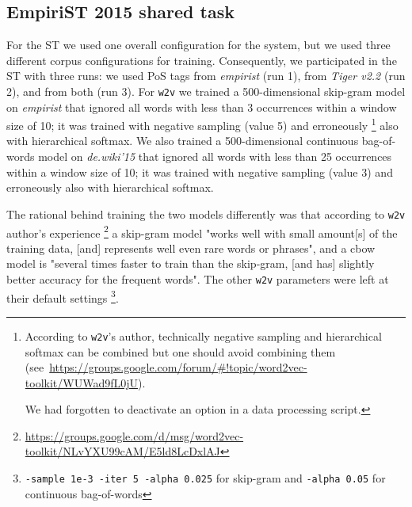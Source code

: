 \documentclass[11pt]{article}
\newcommand\wtv{\texttt{w2v}\xspace}
\begin{document}
%
%


\subsection{EmpiriST 2015 shared task} %
\label{ssec:case_empirist}

For the ST we used one overall configuration for the system, but we used three
different corpus configurations for training.
Consequently, we participated in the ST with three runs:
we used PoS tags from \emph{empirist} (run 1), from \emph{Tiger v2.2} (run 2),
and from both (run 3).  
For \wtv we trained a 500-dimensional skip-gram model on \emph{empirist} that
ignored all words with less than 3 occurrences within a window size of 10;
it was trained with negative sampling (value 5) and erroneously%
\footnote{%
    According to \wtv's author, technically negative sampling and
    hierarchical softmax can be combined but one should avoid combining them~%
    (see~\url{https://groups.google.com/forum/#!topic/word2vec-toolkit/WUWad9fL0jU}).
    
    We had forgotten to deactivate an option in a data processing script.
}
also with hierarchical softmax.
We also trained a 500-dimensional continuous bag-of-words model on
\emph{de.wiki'15} that ignored all words with less than 25 occurrences within a
window size of 10; it was trained with negative sampling (value 3) and
erroneously also with hierarchical softmax.

The rational behind training the two models differently was that according to
\wtv author's experience%
\footnote{\url{https://groups.google.com/d/msg/word2vec-toolkit/NLvYXU99cAM/E5ld8LcDxlAJ}}
a skip-gram model "works well with small amount[s] of the training data, [and]
represents well even rare words or phrases", and a cbow model is "several times
faster to train than the skip-gram, [and has] slightly better accuracy for the
frequent words".
The other \wtv parameters were left at their default settings%
\footnote{\texttt{-sample 1e-3 -iter 5 -alpha 0.025} for skip-gram and
\texttt{-alpha 0.05} for continuous bag-of-words}.
\end{document}
